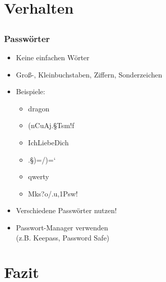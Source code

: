 \documentclass[12pt]{beamer}
\begin{document}
\section{Verhalten}
\subsection{}

\begin{frame}
    \frametitle{Passwörter}
    \begin{itemize}
        \item<2-> Keine einfachen Wörter
        \item<3-> Groß-, Kleinbuchstaben, Ziffern, Sonderzeichen
        \item<4-> Beispiele:
            \begin{itemize}
                \item<5-> dragon
                \item<6-> (nCuAj.§Tsm!f
                \item<7-> IchLiebeDich
                \item<8-> .§)=/)=`
                \item<9-> qwerty
                \item<10-> Mks?o/.u,1Psw!
            \end{itemize}
        \item<12-> Verschiedene Passwörter nutzen!
        \item<13-> Passwort-Manager verwenden \\ (z.B. Keepass, Password Safe)
    \end{itemize}
\end{frame}


\section{Fazit}
\subsection{}
\end{document}
